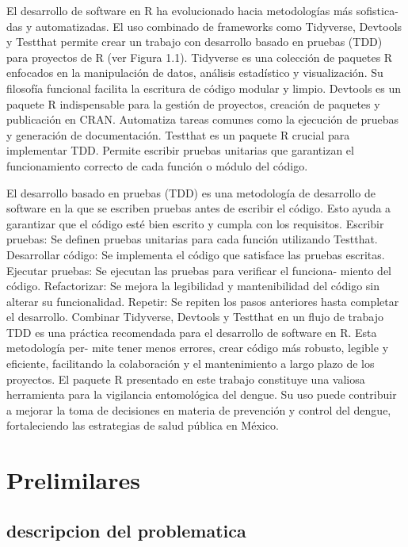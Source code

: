 \documentclass[
  letterpaper,
  twocolumn,
  landscape]{report}
\begin{document}
El desarrollo de software en R ha evolucionado hacia metodologías más
sofistica- das y automatizadas. El uso combinado de frameworks como
Tidyverse, Devtools y Testthat permite crear un trabajo con desarrollo
basado en pruebas (TDD) para proyectos de R (ver Figura 1.1). Tidyverse
es una colección de paquetes R enfocados en la manipulación de datos,
análisis estadístico y visualización. Su filosofía funcional facilita la
escritura de código modular y limpio. Devtools es un paquete R
indispensable para la gestión de proyectos, creación de paquetes y
publicación en CRAN. Automatiza tareas comunes como la ejecución de
pruebas y generación de documentación. Testthat es un paquete R crucial
para implementar TDD. Permite escribir pruebas unitarias que garantizan
el funcionamiento correcto de cada función o módulo del código.

El desarrollo basado en pruebas (TDD) es una metodología de desarrollo
de software en la que se escriben pruebas antes de escribir el código.
Esto ayuda a garantizar que el código esté bien escrito y cumpla con los
requisitos. Escribir pruebas: Se definen pruebas unitarias para cada
función utilizando Testthat. Desarrollar código: Se implementa el código
que satisface las pruebas escritas. Ejecutar pruebas: Se ejecutan las
pruebas para verificar el funciona- miento del código. Refactorizar: Se
mejora la legibilidad y mantenibilidad del código sin alterar su
funcionalidad. Repetir: Se repiten los pasos anteriores hasta completar
el desarrollo. Combinar Tidyverse, Devtools y Testthat en un flujo de
trabajo TDD es una práctica recomendada para el desarrollo de software
en R. Esta metodología per- mite tener menos errores, crear código más
robusto, legible y eficiente, facilitando la colaboración y el
mantenimiento a largo plazo de los proyectos. El paquete R presentado en
este trabajo constituye una valiosa herramienta para la vigilancia
entomológica del dengue. Su uso puede contribuir a mejorar la toma de
decisiones en materia de prevención y control del dengue, fortaleciendo
las estrategias de salud pública en México.


\chapter{Prelimilares}\label{prelimilares}

\section{descripcion del
problematica}\label{descripcion-del-problematica}
\end{document}
